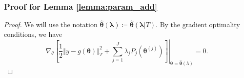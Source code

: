 \documentclass[10pt]{book}
\theoremstyle{definition}
\begin{document}
\subsubsection{Proof for Lemma \ref{lemma:param_add}}
\begin{proof}
	We will use the notation $\hat{\boldsymbol{\theta}}(\boldsymbol{\lambda}) \coloneqq \hat{\boldsymbol{\theta}}(\boldsymbol{\lambda} | T)$. By the gradient optimality conditions, we have
	\begin{equation}
	\label{eq:grad_opt}
	\left.\nabla_{\theta} \left [
	\frac{1}{2}\left\Vert y-g(\boldsymbol{\theta})\right\Vert _{T}^{2}+
	\sum_{j=1}^J \lambda_{j}P_{j}(\boldsymbol{\theta}^{(j)})
	\right ]
	\right|_{\boldsymbol{\theta}=\hat{\boldsymbol{\theta}}(\lambda)}=0.
	\end{equation}
	

\end{proof}
\end{document}
